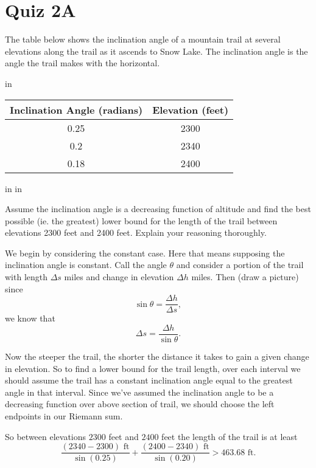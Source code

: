 \documentclass{ximera}
\newcommand{\pskip}{\vskip 0.1 in}
\begin{document}
\section{Quiz 2A}

\begin{question} \label{QKDFEFEFE}
The table below shows the inclination angle of a mountain trail at several elevations along the trail as it ascends to Snow Lake. The inclination angle is the angle the trail makes with the horizontal.

\pskip

\begin{tabular}{|c|c|}
\hline
Inclination Angle (radians) & Elevation (feet) \\
\hline
0.25 & 2300 \\  \hline
0.2  & 2340 \\ \hline
0.18 & 2400 \\ \hline
\end{tabular}

\pskip \pskip


Assume the inclination angle is a decreasing function of altitude and find the best possible (ie. the greatest) lower bound for the length of the trail between elevations 2300 feet and 2400 feet. Explain your reasoning thoroughly.


\begin{explanation}
We begin by considering the constant case. Here that means supposing the inclination angle is constant. Call the angle $\theta$ and consider a portion of the trail with length $\Delta s$ miles and change in elevation $\Delta h$ miles. Then (draw a picture) since
\[
   \sin \theta = \frac{\Delta h}{\Delta s} ,
\]
we know that
\[
  \Delta s = \frac{\Delta h}{\sin\theta}.
\]

Now the steeper the trail, the shorter the distance it takes to gain a given change in elevation. So to find a lower bound for the trail length, over each interval we should assume the trail has a constant inclination angle equal to the greatest angle in that interval. Since we've assumed the inclination angle to be a decreasing function over above section of trail, we should choose the left endpoints in our Riemann sum.

So between elevations $2300$ feet and $2400$ feet the length of the trail is at least
\[
\frac{(2340 - 2300)\text{ ft}}{\sin(0.25)} + \frac{(2400 - 2340)\text{ ft}}{\sin(0.20)}  > 463.68 \text{ ft}.
\]

\end{explanation}

\end{question}
\end{document}
